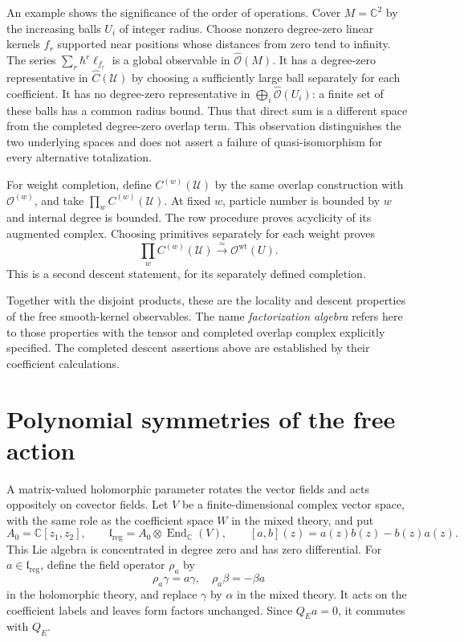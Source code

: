 An example shows the significance of the order of operations.
Cover $M=\mathbb C^2$ by the increasing balls $U_i$ of integer radius.
Choose nonzero degree-zero linear kernels $f_r$ supported near positions whose
distances from zero tend to infinity.
The series $\sum_r\hbar^r\ell_{f_r}$ is a global observable in
$\widehat{\mathscr O}(M)$.
It has a degree-zero representative in $\widehat C(\mathcal U)$ by
choosing a sufficiently large ball separately for each coefficient.
It has no degree-zero representative in
$\bigoplus_i\widehat{\mathscr O}(U_i)$:
a finite set of these balls has a common radius bound.
Thus that direct sum is a different space from the completed degree-zero
overlap term. This observation distinguishes the two underlying spaces and does not
assert a failure of quasi-isomorphism for every alternative totalization.

For weight completion, define $C^{(w)}(\mathcal U)$ by the same
overlap construction with $\mathscr O^{(w)}$, and take
$\prod_w C^{(w)}(\mathcal U)$.
At fixed $w$, particle number is bounded by $w$ and internal degree is
bounded. The row procedure proves acyclicity of its augmented complex.
Choosing primitives separately for each weight proves
\[
 \prod_w C^{(w)}(\mathcal U)
 \xrightarrow{\ \simeq\ }\mathscr O^{\mathrm{wt}}(U).
\]
This is a second descent statement, for its separately defined completion.

Together with the disjoint products, these are the locality and descent
properties of the free smooth-kernel observables.
The name \emph{factorization algebra} refers here to those properties
with the tensor and completed overlap complex explicitly specified.
The completed descent assertions above are established by their
coefficient calculations.

\section{Polynomial symmetries of the free action}
\label{sec:clo-kernel-symmetries}

A matrix-valued holomorphic parameter rotates the vector fields and
acts oppositely on covector fields.
Let $V$ be a finite-dimensional complex vector space, with the same
role as the coefficient space $W$ in the mixed theory, and put
\[
 A_0=\mathbb C[z_1,z_2],\qquad
 \mathfrak l_{\mathrm{reg}}=A_0\otimes\operatorname{End}_{\mathbb C}(V),
 \qquad [a,b](z)=a(z)b(z)-b(z)a(z).
\]
This Lie algebra is concentrated in degree zero and has zero differential.
For $a\in\mathfrak l_{\mathrm{reg}}$, define the field operator
$\rho_a$ by
\[
 \rho_a\gamma=a\gamma,\quad \rho_a\beta=-\beta a
\]
in the holomorphic theory, and replace $\gamma$ by $\alpha$ in the
mixed theory. It acts on the coefficient labels and leaves form factors
unchanged. Since $Q_Ea=0$, it commutes with $Q_E$.

